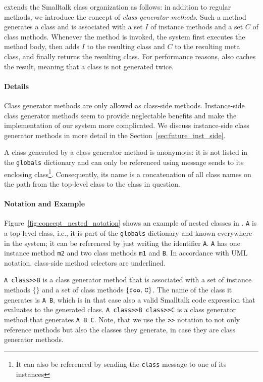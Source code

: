 \msname extends the Smalltalk class organization as follows: in addition to regular methods, we introduce the concept of \emph{class generator methods}. Such a method generates a class and is associated with a set $I$ of instance methods and a set $C$ of class methods. Whenever the method is invoked, the system first executes the method body, then adds $I$ to the resulting class and $C$ to the resulting meta class, and finally returns the resulting class. For performance reasons, \msname also caches the result, meaning that a class is not generated twice.

\paragraph{Details}
Class generator methods are only allowed as class-side methods. Instance-side class generator methods seem to provide neglectable benefits and make the implementation of our system more complicated. We discuss instance-side class generator methods in more detail in the Section~\ref{sec:future_inst_side}.

A class generated by a class generator method is anonymous: it is not listed in the \texttt{globals} dictionary and can only be referenced using message sends to its enclosing class\footnote{It can also be referenced by sending the \texttt{class} message to one of its instances}. Consequently, its name is a concatenation of all class names on the path from the top-level class to the class in question.


\paragraph{Notation and Example}
Figure~\ref{fig:concept_nested_notation} shows an example of nested classes in \msname. \texttt{A} is a top-level class, i.e., it is part of the \texttt{globals} dictionary and known everywhere in the system; it can be referenced by just writing the identifier \texttt{A}. \texttt{A} has one instance method \texttt{m2} and two class methods \texttt{m1} and \texttt{B}. In accordance with UML notation, class-side method selectors are underlined. 

\texttt{A class>>B} is a class generator method that is associated with a set of instance methods $\{\}$ and a set of class methods $\{\mbox{\texttt{foo}, \texttt{C}}\}$. The name of the class it generates is \texttt{A B}, which is in that case also a valid Smalltalk code expression that evaluates to the generated class. \texttt{A class>>B class>>C} is a class generator method that generates \texttt{A B C}. Note, that we use the \texttt{>>} notation to not only reference methods but also the classes they generate, in case they are class generator methods.

